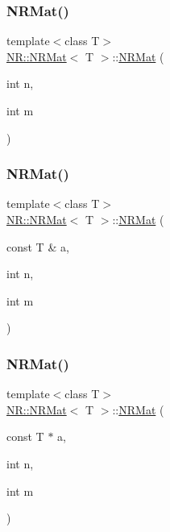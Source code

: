 \mbox{\label{classNR_1_1NRMat_a52799868d76fb74a2d73b8d8291a9215}} 
\subsubsection{\texorpdfstring{NRMat()}{NRMat()}\hspace{0.1cm}{\footnotesize\ttfamily [12/15]}}
{\footnotesize\ttfamily template$<$class T$>$ \\
\mbox{\hyperlink{classNR_1_1NRMat}{N\+R\+::\+N\+R\+Mat}}$<$ T $>$\+::\mbox{\hyperlink{classNR_1_1NRMat}{N\+R\+Mat}} (\begin{DoxyParamCaption}\item[{int}]{n,  }\item[{int}]{m }\end{DoxyParamCaption})}

\mbox{\label{classNR_1_1NRMat_a31a0ecf81920c576b25e3c49bfa5e444}} 
\subsubsection{\texorpdfstring{NRMat()}{NRMat()}\hspace{0.1cm}{\footnotesize\ttfamily [13/15]}}
{\footnotesize\ttfamily template$<$class T$>$ \\
\mbox{\hyperlink{classNR_1_1NRMat}{N\+R\+::\+N\+R\+Mat}}$<$ T $>$\+::\mbox{\hyperlink{classNR_1_1NRMat}{N\+R\+Mat}} (\begin{DoxyParamCaption}\item[{const T \&}]{a,  }\item[{int}]{n,  }\item[{int}]{m }\end{DoxyParamCaption})}

\mbox{\label{classNR_1_1NRMat_a30ddcc485a9e735b1fafbb56022fdc3a}} 
\subsubsection{\texorpdfstring{NRMat()}{NRMat()}\hspace{0.1cm}{\footnotesize\ttfamily [14/15]}}
{\footnotesize\ttfamily template$<$class T$>$ \\
\mbox{\hyperlink{classNR_1_1NRMat}{N\+R\+::\+N\+R\+Mat}}$<$ T $>$\+::\mbox{\hyperlink{classNR_1_1NRMat}{N\+R\+Mat}} (\begin{DoxyParamCaption}\item[{const T $\ast$}]{a,  }\item[{int}]{n,  }\item[{int}]{m }\end{DoxyParamCaption})}

